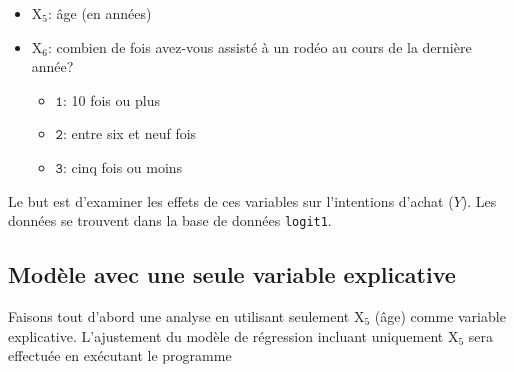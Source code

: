 \documentclass[
  11pt,
  letterpaper,
]{scrbook}
\providecommand{\tightlist}{%
  \setlength{\itemsep}{0pt}\setlength{\parskip}{0pt}}\usepackage{longtable,booktabs,array}
\theoremstyle{definition}
\theoremstyle{remark}
\begin{document}
\begin{itemize}
  \begin{itemize}
  \tightlist
  \item
    \(\texttt{0}\): non
  \item
    \(\texttt{1}\): oui
  \end{itemize}
\item
  \(\mathrm{X}_5\): âge (en années)
\item
  \(\mathrm{X}_6\): combien de fois avez-vous assisté à un rodéo au
  cours de la dernière année?

  \begin{itemize}
  \tightlist
  \item
    \(\texttt{1}\): 10 fois ou plus
  \item
    \(\texttt{2}\): entre six et neuf fois
  \item
    \(\texttt{3}\): cinq fois ou moins
  \end{itemize}
\end{itemize}

Le but est d'examiner les effets de ces variables sur l'intentions
d'achat (\(Y\)). Les données se trouvent dans la base de données
\texttt{logit1}.

\subsection{Modèle avec une seule variable
explicative}\label{moduxe8le-avec-une-seule-variable-explicative}

Faisons tout d'abord une analyse en utilisant seulement \(\mathrm{X}_5\)
(âge) comme variable explicative. L'ajustement du modèle de régression
incluant uniquement \(\mathrm{X}_5\) sera effectuée en exécutant le
programme
\end{document}
